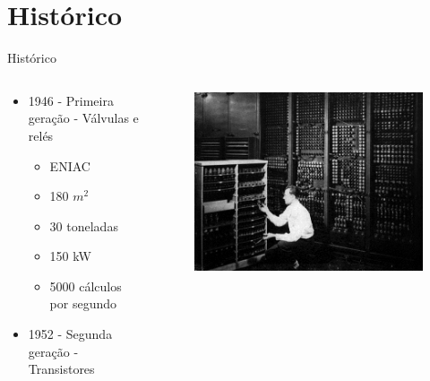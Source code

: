 \documentclass[aspectratio=169,
				xcolor=table]{beamer}
\begin{document}
	\section{Histórico}
	\begin{frame}{Histórico}
	
		\begin{columns}
			\begin{column}{0.6\textwidth}
				\begin{itemize}
					\item 1946 - Primeira geração - Válvulas e relés
						\begin{itemize}
							\item ENIAC
							\item 180 $m^2$
							\item 30 toneladas
							\item 150 kW
							\item 5000 cálculos por segundo
						\end{itemize}			
					\vspace{1em}
					\item 1952 - Segunda geração - Transistores
				\end{itemize}
			\end{column}
			\begin{column}{0.4\textwidth}
				\begin{figure}[hbtp]
				\centering
				\includegraphics[width=.95\textwidth, keepaspectratio]{../figs/cap04/eniac.png}
				\end{figure}			

			\end{column}
		\end{columns}
	\end{frame}
	
\end{document}
